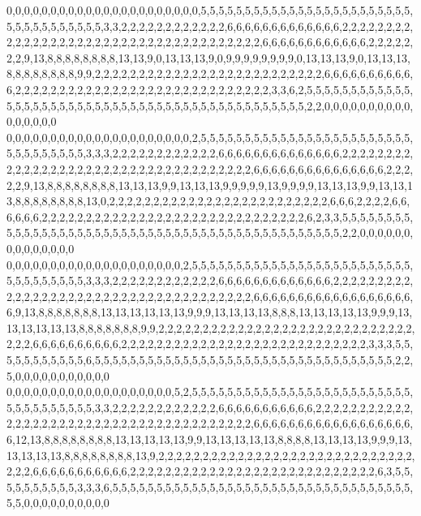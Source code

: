 0,0,0,0,0,0,0,0,0,0,0,0,0,0,0,0,0,0,0,0,0,0,5,5,5,5,5,5,5,5,5,5,5,5,5,5,5,5,5,5,5,5,5,5,5,5,5,5,5,5,5,5,5,5,5,5,5,3,3,2,2,2,2,2,2,2,2,2,2,2,2,6,6,6,6,6,6,6,6,6,6,6,6,6,2,2,2,2,2,2,2,2,2,2,2,2,2,2,2,2,2,2,2,2,2,2,2,2,2,2,2,2,2,2,2,2,2,2,2,2,2,6,6,6,6,6,6,6,6,6,6,6,6,2,2,2,2,2,2,2,9,13,8,8,8,8,8,8,8,8,13,13,9,0,13,13,13,9,0,9,9,9,9,9,9,9,9,0,13,13,13,9,0,13,13,13,8,8,8,8,8,8,8,8,9,9,2,2,2,2,2,2,2,2,2,2,2,2,2,2,2,2,2,2,2,2,2,2,2,2,2,2,6,6,6,6,6,6,6,6,6,6,6,2,2,2,2,2,2,2,2,2,2,2,2,2,2,2,2,2,2,2,2,2,2,2,2,2,2,2,2,2,3,3,6,2,5,5,5,5,5,5,5,5,5,5,5,5,5,5,5,5,5,5,5,5,5,5,5,5,5,5,5,5,5,5,5,5,5,5,5,5,5,5,5,5,5,5,5,5,5,5,2,2,0,0,0,0,0,0,0,0,0,0,0,0,0,0,0,0
0,0,0,0,0,0,0,0,0,0,0,0,0,0,0,0,0,0,0,0,0,2,5,5,5,5,5,5,5,5,5,5,5,5,5,5,5,5,5,5,5,5,5,5,5,5,5,5,5,5,5,5,5,5,5,3,3,3,2,2,2,2,2,2,2,2,2,2,2,2,6,6,6,6,6,6,6,6,6,6,6,6,6,6,2,2,2,2,2,2,2,2,2,2,2,2,2,2,2,2,2,2,2,2,2,2,2,2,2,2,2,2,2,2,2,2,2,2,2,2,6,6,6,6,6,6,6,6,6,6,6,6,6,6,6,2,2,2,2,2,9,13,8,8,8,8,8,8,8,8,13,13,13,9,9,13,13,13,9,9,9,9,9,13,9,9,9,9,13,13,13,9,9,13,13,13,8,8,8,8,8,8,8,8,13,0,2,2,2,2,2,2,2,2,2,2,2,2,2,2,2,2,2,2,2,2,2,2,2,2,2,6,6,6,2,2,2,2,6,6,6,6,6,6,2,2,2,2,2,2,2,2,2,2,2,2,2,2,2,2,2,2,2,2,2,2,2,2,2,2,2,2,2,2,6,2,3,3,5,5,5,5,5,5,5,5,5,5,5,5,5,5,5,5,5,5,5,5,5,5,5,5,5,5,5,5,5,5,5,5,5,5,5,5,5,5,5,5,5,5,5,5,5,5,2,2,0,0,0,0,0,0,0,0,0,0,0,0,0,0
0,0,0,0,0,0,0,0,0,0,0,0,0,0,0,0,0,0,0,0,2,5,5,5,5,5,5,5,5,5,5,5,5,5,5,5,5,5,5,5,5,5,5,5,5,5,5,5,5,5,5,5,5,5,5,3,3,3,2,2,2,2,2,2,2,2,2,2,2,2,6,6,6,6,6,6,6,6,6,6,6,6,6,2,2,2,2,2,2,2,2,2,2,2,2,2,2,2,2,2,2,2,2,2,2,2,2,2,2,2,2,2,2,2,2,2,2,2,2,2,6,6,6,6,6,6,6,6,6,6,6,6,6,6,6,6,6,6,6,9,13,8,8,8,8,8,8,8,13,13,13,13,13,13,9,9,9,13,13,13,13,8,8,8,13,13,13,13,13,9,9,9,13,13,13,13,13,13,8,8,8,8,8,8,8,9,9,2,2,2,2,2,2,2,2,2,2,2,2,2,2,2,2,2,2,2,2,2,2,2,2,2,2,2,2,2,2,2,2,6,6,6,6,6,6,6,6,6,6,2,2,2,2,2,2,2,2,2,2,2,2,2,2,2,2,2,2,2,2,2,2,2,2,2,2,2,2,3,3,3,5,5,5,5,5,5,5,5,5,5,5,6,5,5,5,5,5,5,5,5,5,5,5,5,5,5,5,5,5,5,5,5,5,5,5,5,5,5,5,5,5,5,5,5,5,5,2,2,5,0,0,0,0,0,0,0,0,0,0,0
0,0,0,0,0,0,0,0,0,0,0,0,0,0,0,0,0,0,0,5,2,5,5,5,5,5,5,5,5,5,5,5,5,5,5,5,5,5,5,5,5,5,5,5,5,5,5,5,5,5,5,5,5,5,5,5,3,3,2,2,2,2,2,2,2,2,2,2,2,2,6,6,6,6,6,6,6,6,6,6,6,2,2,2,2,2,2,2,2,2,2,2,2,2,2,2,2,2,2,2,2,2,2,2,2,2,2,2,2,2,2,2,2,2,2,2,2,2,2,2,6,6,6,6,6,6,6,6,6,6,6,6,6,6,6,6,6,6,6,12,13,8,8,8,8,8,8,8,8,13,13,13,13,13,9,9,13,13,13,13,13,8,8,8,8,13,13,13,13,9,9,9,13,13,13,13,13,8,8,8,8,8,8,8,8,13,9,2,2,2,2,2,2,2,2,2,2,2,2,2,2,2,2,2,2,2,2,2,2,2,2,2,2,2,2,2,2,2,2,6,6,6,6,6,6,6,6,6,6,6,2,2,2,2,2,2,2,2,2,2,2,2,2,2,2,2,2,2,2,2,2,2,2,2,2,2,2,2,6,3,5,5,5,5,5,5,5,5,5,5,3,3,3,6,5,5,5,5,5,5,5,5,5,5,5,5,5,5,5,5,5,5,5,5,5,5,5,5,5,5,5,5,5,5,5,5,5,5,5,5,0,0,0,0,0,0,0,0,0,0
